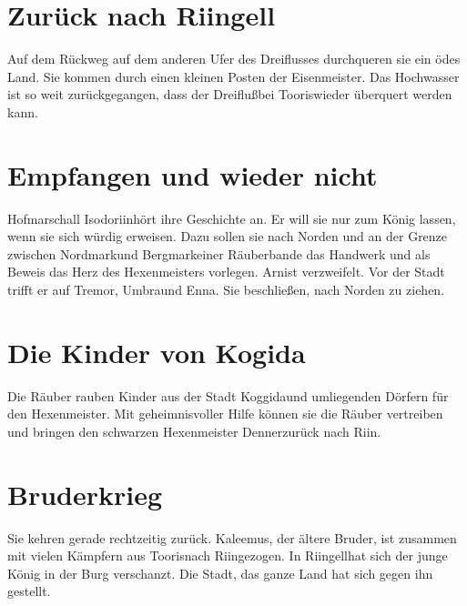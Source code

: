 \documentclass[12pt,a4paper,onecolumn,twoside,ngerman]{book}
\newcommand{\Umbra}{Umbra}
\newcommand{\Enna}{Enna}
\newcommand{\Tremor}{Tremor}
\newcommand{\Nordmark}{Nordmark}
\newcommand{\Bergmark}{Bergmark}
\newcommand{\Arn}{Arn}
\newcommand{\Rhingell}{Riingell}
\newcommand{\Rhin}{Riin}
\newcommand{\Kalemus}{Kaleemus}
\newcommand{\Isodoriin}{Isodoriin}
\newcommand{\Kogida}{Koggida}
\newcommand{\Denner}{Denner}
\newcommand{\Dreifluss}{Dreifluß}
\newcommand{\Toris}{Tooris}
\newcommand{\Eisenmeister}{Eisenmeister}
\begin{document}
\section{Zurück nach \Rhingell}
Auf dem Rückweg auf dem anderen Ufer des Dreiflusses durchqueren sie ein ödes Land. Sie kommen durch einen kleinen Posten der \Eisenmeister. 
Das Hochwasser ist so weit zurückgegangen, dass der \Dreifluss bei \Toris wieder überquert werden kann.


\section{Empfangen und wieder nicht}
Hofmarschall \Isodoriin hört ihre Geschichte an. Er will sie nur zum König lassen, wenn sie sich würdig erweisen. Dazu sollen sie nach Norden und an der Grenze zwischen \Nordmark und \Bergmark einer Räuberbande das Handwerk und als Beweis das Herz des Hexenmeisters vorlegen. \Arn ist verzweifelt. Vor der Stadt trifft er auf \Tremor , \Umbra und \Enna . Sie beschließen, nach Norden zu ziehen.

\section{Die Kinder von Kogida}
Die Räuber rauben Kinder aus der Stadt \Kogida und umliegenden Dörfern für den Hexenmeister. Mit geheimnisvoller Hilfe können sie die Räuber vertreiben und bringen den schwarzen Hexenmeister \Denner zurück nach \Rhin .

\section{Bruderkrieg}
Sie kehren gerade rechtzeitig zurück. \Kalemus , der ältere Bruder, ist zusammen mit vielen Kämpfern aus \Toris nach \Rhin gezogen. In \Rhingell hat sich der junge König in der Burg verschanzt. Die Stadt, das ganze Land hat sich gegen ihn gestellt. 
\end{document}
